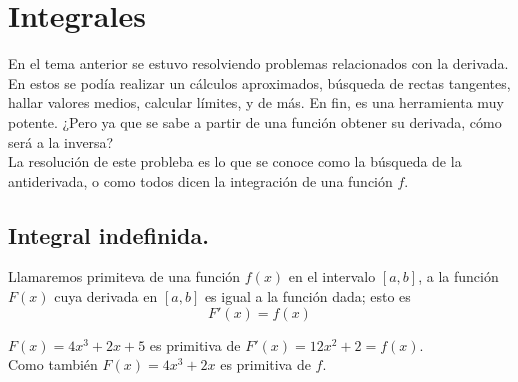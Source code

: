 \documentclass[10pt,twoside]{SelfArx} %
\begin{document}
    
    
    
    
    
    
    
    
    
    
    
    
    
 
 




\section{Integrales}
En el tema anterior  se estuvo resolviendo problemas relacionados con la derivada. En estos se podía realizar un cálculos aproximados, búsqueda de rectas tangentes, hallar valores medios, calcular límites, y de más. En fin, es una herramienta muy potente. ¿Pero ya que se sabe a partir de una función obtener su derivada, cómo será a la inversa?\\
La resolución de este probleba es lo que se conoce como la búsqueda de la antiderivada, o como todos dicen la integración de una función $ f $.
 
 
 
 \subsection{Integral indefinida. }
 \begin{thm}
 	Llamaremos primiteva de una función $ f(x) $ en el intervalo $ [a,b] $, a la función $ F(x) $ cuya derivada en $ [a,b] $ es igual a la función dada; esto es
 	\begin{equation}
 	F'(x)=f(x)
 	\end{equation}
 \end{thm}
 \begin{ejemplo}
 	$ F(x)=4x^{3}+2x+5 $ es primitiva de $ F'(x)=12x^{2}+2=f(x) $.\\
 	Como tambi\'en $ F(x)=4x^{3}+2x $ es primitiva de $ f $.
 \end{ejemplo}
 
\end{document}
